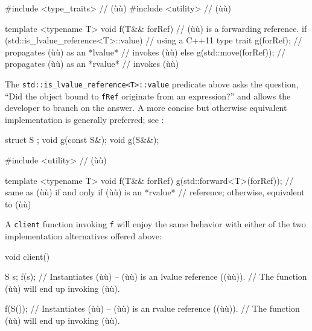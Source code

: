 \begin{emcppslisting}[emcppsbatch=e1]
#include <type_traits>  // (ù{}ù)
#include <utility>  // (ù{}ù)

template <typename T>
void f(T&& forRef)      // (ù{}ù) is a forwarding reference.
{
    if (std::is_lvalue_reference<T>::value)  // using a C++11 type trait
    {
        g(forRef);             // propagates (ù{}ù) as an *lvalue*
    }                          // invokes (ù{}ù)
    else
    {
        g(std::move(forRef));  // propagates (ù{}ù) as an *rvalue*
    }                          // invokes (ù{}ù)
}
\end{emcppslisting}

\noindent The \lstinline!std::is_lvalue_reference<T>::value! predicate above asks
the question, ``Did the object bound to \lstinline!fRef! originate
from an  expression?'' and allows the developer to branch on the
answer. A more concise but otherwise equivalent implementation is
generally preferred; see :

\begin{emcppshiddenlisting}[emcppsbatch=e2]
struct S {};
void g(const S&);
void g(S&&);
\end{emcppshiddenlisting}
\begin{emcppslisting}[emcppsbatch=e2]
#include <utility>  // (ù{}ù)

template <typename T>
void f(T&& forRef)
{
    g(std::forward<T>(forRef));
        // same as (ù{}ù) if and only if (ù{}ù) is an *rvalue*
        // reference; otherwise, equivalent to (ù{}ù)
}
\end{emcppslisting}

\noindent A \lstinline!client! function invoking \lstinline!f! will enjoy the same
behavior with either of the two implementation alternatives offered
above:

\begin{emcppslisting}[emcppsbatch=e2]
void client()
{
    S s;
    f(s);    // Instantiates (ù{}ù) -- (ù{}ù) is an lvalue reference ((ù{}ù)).
             // The function (ù{}ù) will end up invoking (ù{}ù).

    f(S());  // Instantiates (ù{}ù) -- (ù{}ù) is an rvalue reference ((ù{}ù)).
             // The function (ù{}ù) will end up invoking (ù{}ù).
}
\end{emcppslisting}


